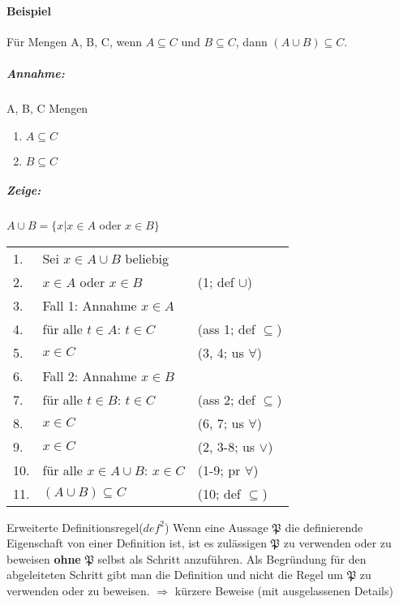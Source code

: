             \paragraph{Beispiel} 
                Für Mengen A, B, C, wenn \(A \subseteq C\) und \(B \subseteq C\), dann \((A \cup B) \subseteq C\).
                \subparagraph{Annahme:}
                    A, B, C Mengen
                    \begin{enumerate}
                        \item \(A \subseteq C\)
                        \item \(B \subseteq C\)
                    \end{enumerate}
                \subparagraph{Zeige:}
                    \(A \cup B = \{x \vert x \in A\) oder \(x \in B\}\)
                    \\
                    \renewcommand{\arraystretch}{1.5} %
                    \begin{tabular}{p{0.8cm}p{6cm}p{4cm}}
                        1. & Sei $x \in A \cup B$ beliebig & \\
                        2. & $x \in A$ oder $x \in B$ & (1; def $\cup$) \\
                        3. & Fall 1: Annahme $x \in A$ & \\
                        4. & für alle $t \in A$: $t \in C$ & (ass 1; def $\subseteq$) \\
                        5. & $x \in C$ & (3, 4; us $\forall$) \\
                        6. & Fall 2: Annahme $x \in B$ & \\
                        7. & für alle $t \in B$: $t \in C$ & (ass 2; def $\subseteq$) \\
                        8. & $x \in C$ & (6, 7; us $\forall$) \\
                        9. & $x \in C$ & (2, 3-8; us $\lor$) \\
                        10. & für alle $x \in A \cup B$: $x \in C$ & (1-9; pr $\forall$) \\
                        11. & $(A \cup B) \subseteq C$ & (10; def $\subseteq$) \\
                    \end{tabular}
        {
            Erweiterte Definitionsregel(\(def^2\))
        }
        {
            Wenn eine Aussage \(\mathfrak{P}\) die definierende Eigenschaft von einer Definition ist, ist es zulässigen \(\mathfrak{P}\) zu verwenden oder zu beweisen \textbf{ohne} \(\mathfrak{P}\) selbst als Schritt anzuführen. Als Begründung für den abgeleiteten Schritt gibt man die Definition und nicht die Regel um \(\mathfrak{P}\) zu verwenden oder zu beweisen.  
        }
        \(\Rightarrow\) kürzere Beweise (mit ausgelassenen Details)
